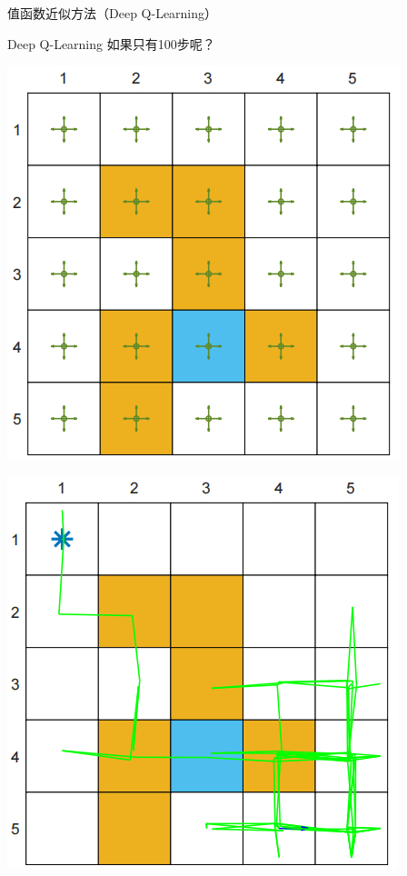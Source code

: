 \begin{section}{值函数近似方法\alert{（Deep Q-Learning）}}
\begin{frame}{Deep Q-Learning}
    如果只有100步呢？
    \begin{center}
        \begin{minipage}{0.18\textwidth}
            \centering
            \includegraphics[width=\linewidth]{assets/DQN100behavior.png}
        \end{minipage}
        \hspace{1cm}
        \begin{minipage}{0.18\textwidth}
            \centering
            \includegraphics[width=\linewidth]{assets/DQN100episode.png}

\end{minipage}
\end{center}
\end{frame}
\end{section}

